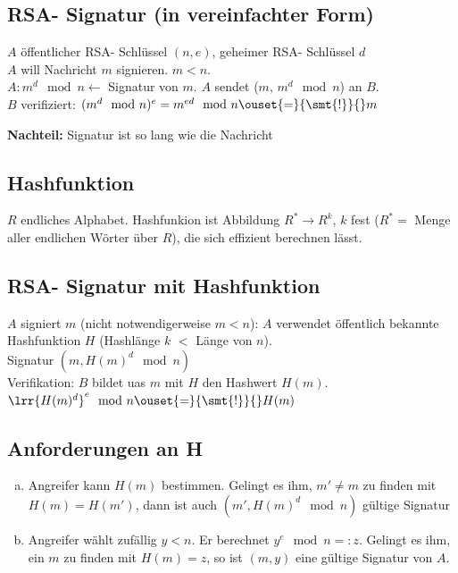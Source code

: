  \subsection{RSA- Signatur (in vereinfachter Form)}
    $A$ öffentlicher RSA- Schlüssel $(n,e)$, geheimer RSA- Schlüssel $d$\\
    $A$ will Nachricht $m$ signieren. $m<n$.\\
    $A: m^d\mod n\longleftarrow$ Signatur von $m$. $A$ sendet ($m$, $m^d\mod
    n$) an $B$.\\
    $B$ verifiziert: $(m^d\mod n)^e=m^{ed}\mod n\ouset{=}{\smt{!}}{}m$

    \textbf{Nachteil:} Signatur ist so lang wie die Nachricht

  \subsection{Hashfunktion}
    $R$ endliches Alphabet. Hashfunkion ist Abbildung $R^*\rightarrow R^k$, $k$
    fest ($R^*=$ Menge aller endlichen Wörter über $R$), die sich effizient
    berechnen lässt.

  \subsection{RSA- Signatur mit Hashfunktion}
    $A$ signiert $m$ (nicht notwendigerweise $m<n$): $A$ verwendet öffentlich
    bekannte Hashfunktion $H$ (Hashlänge $k$ $<$ Länge von $n$).\\
    Signatur $(m,H(m)^d\mod n)$\\
    Verifikation: $B$ bildet uas $m$ mit $H$ den Hashwert $H(m)$.
    $\lrr{H(m)^d}^e\mod n\ouset{=}{\smt{!}}{}H(m)$

  \subsection{Anforderungen an H}
    \begin{enumerate}[a)]
      \item Angreifer kann $H(m)$ bestimmen. Gelingt es ihm, $m'\neq m$ zu
        finden mit $H(m)=H(m')$, dann ist auch $(m', H(m)^d\mod n)$ gültige
        Signatur
      \item Angreifer wählt zufällig $y<n$. Er berechnet $y^e\mod n=:z$.
        Gelingt es ihm, ein $m$ zu finden mit $H(m)=z$, so ist $(m, y)$ eine
        gültige Signatur von $A$.\\
    \end{enumerate}

